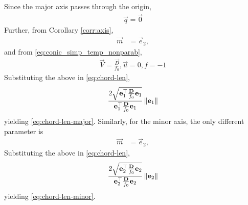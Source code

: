 \documentclass[journal,12pt,onecolumn]{IEEEtran}
\renewcommand\thesection{\arabic{section}}
\begin{document}
\begin{enumerate}[label=\thesection.\arabic*.,ref=\thesection.\theenumi]
		\section{}
		\label{app:major}
		Since the major axis passes through the origin, 
  \begin{align}
	  \vec{q} =			\vec{0} 
\end{align}  
Further, from Corollary  
		\eqref{corr:axis},
  \begin{align}
  \vec{m}&= \vec{e}_2,  
\end{align} and
from 
    \eqref{eq:conic_simp_temp_nonparab},
  \begin{align}
	  \vec{V} =     \frac{\vec{D} }{f_0}, 
	   \vec{u} = 0, 
	   f = -1
	    \label{eq:latus_rectum_ellipse_param}
\end{align}  
Substituting the above in
\eqref{eq:chord-len}, 
\begin{align}
 \frac{2\sqrt{
\mathbf{e}_1^{\top}\frac{\mathbf{D}}{f_0}\mathbf{e}_1
}
}
{
\mathbf{e}_1^{\top}\frac{\mathbf{D}}{f_0}\mathbf{e}_1
}\left\lVert\mathbf{e}_1\right\rVert
  \end{align}
  yielding 
\eqref{eq:chord-len-major}.
Similarly, for the minor axis, the only different parameter is 
  \begin{align}
  \vec{m}&= \vec{e}_2,  
\end{align} 
Substituting the above in
\eqref{eq:chord-len}, 
\begin{align}
 \frac{2\sqrt{
\mathbf{e}_2^{\top}\frac{\mathbf{D}}{f_0}\mathbf{e}_2
}
}
{
\mathbf{e}_2^{\top}\frac{\mathbf{D}}{f_0}\mathbf{e}_2
}\left\lVert\mathbf{e}_2\right\rVert
  \end{align}
  yielding 
\eqref{eq:chord-len-minor}.

\end{enumerate}
\end{document}
